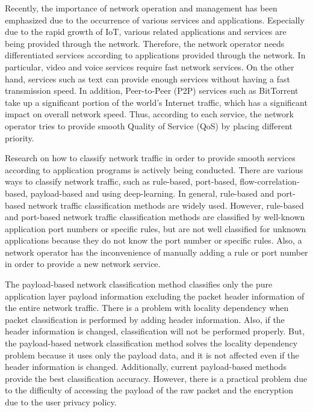 Recently, the importance of network operation and management has been emphasized due to the occurrence of various services and applications.
Especially due to the rapid growth of IoT, various related applications and services are being provided through the network.
Therefore, the network operator needs differentiated services according to applications provided through the network.
In particular, video and voice services require fast network services.
On the other hand, services such as text can provide enough services without having a fast transmission speed.
In addition, Peer-to-Peer (P2P) services such as BitTorrent take up a significant portion of the world's Internet traffic, which has a significant impact on overall network speed.
Thus, according to each service, the network operator tries to provide smooth Quality of Service (QoS) by placing different priority.

Research on how to classify network traffic in order to provide smooth services according to application programs is actively being conducted.
There are various ways to classify network traffic, such as rule-based, port-based, flow-correlation-based, payload-based and using deep-learning.
In general, rule-based and port-based network traffic classification methods are widely used.
However, rule-based and port-based network traffic classification methods are classified by well-known application port numbers or specific rules, but are not well classified for unknown applications because they do not know the port number or specific rules.
Also, a network operator has the inconvenience of manually adding a rule or port number in order to provide a new network service.

The payload-based network classification method classifies only the pure application layer payload information excluding the packet header information of the entire network traffic.
There is a problem with locality dependency when packet classification is performed by adding header information.
Also, if the header information is changed, classification will not be performed properly.
But, the payload-based network classification method solves the locality dependency problem because it uses only the payload data, and it is not affected even if the header information is changed.
Additionally, current payload-based methods provide the best classification accuracy.
However, there is a practical problem due to the difficulty of accessing the payload of the raw packet and the encryption due to the user privacy policy.

